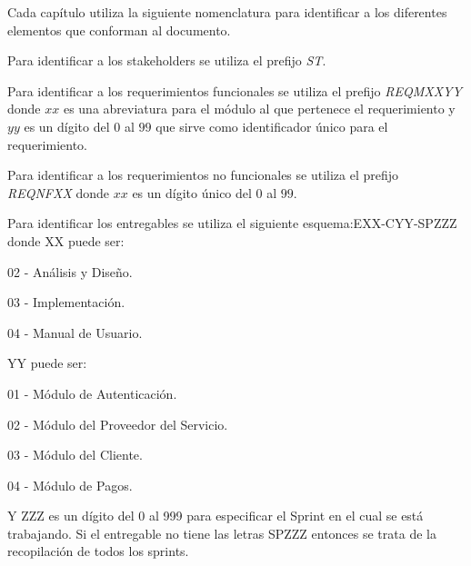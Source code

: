 Cada capítulo utiliza la siguiente nomenclatura para identificar a los diferentes elementos que conforman al documento.

\begin{Citemize}
	\item Para identificar a los stakeholders se utiliza el prefijo \textit{ST}.
	\item Para identificar a los requerimientos funcionales se utiliza el prefijo \textit{REQMXXYY} donde $xx$ es una abreviatura para el módulo al que pertenece el requerimiento y  $yy$ es un dígito del $0$ al $99$ que sirve como identificador único para el requerimiento.
	\item Para identificar a los requerimientos no funcionales se utiliza el prefijo \textit{REQNFXX} donde $xx$ es un dígito único del $0$ al $99$.
	\item Para identificar los entregables se utiliza el siguiente esquema:EXX-CYY-SPZZZ donde XX puede ser:
			\begin{Citemize}
				\item 02 - Análisis y Diseño.
				\item 03 - Implementación.
				\item 04 - Manual de Usuario.
			\end{Citemize}
		 YY puede ser:
		 	\begin{Citemize}
				\item 01 - Módulo de Autenticación.
				\item 02 - Módulo del Proveedor del Servicio.
				\item 03 - Módulo del Cliente.
				\item 04 - Módulo de Pagos.
			\end{Citemize}
		Y ZZZ es un dígito del 0 al 999 para especificar el Sprint en el cual se está trabajando. Si el entregable no tiene las letras SPZZZ entonces se trata de la recopilación de todos los sprints.
\end{Citemize}

